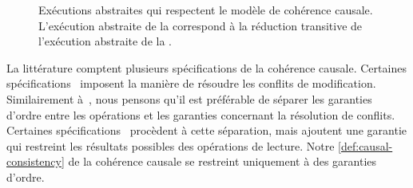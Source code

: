 \begin{figure}[tbh]
\begin{subfigure}{\linewidth}
    \caption{}\label{fig:vis-vs-pre-2}
\end{subfigure}
\caption[Exécutions abstraites qui respectent le modèle de cohérence causale]{Exécutions abstraites qui respectent le modèle de cohérence causale.
L'exécution abstraite de la  correspond à la réduction transitive de l'exécution abstraite de la .}\label{fig:vis-vs-pre}
\end{figure}

La littérature comptent plusieurs spécifications de la cohérence causale.
Certaines spécifications~\autocite{ahamad_1995_causal} imposent la manière de résoudre les conflits de modification.
Similairement à~\textcite{mahajan_2011_cac}, nous pensons qu'il est préférable de séparer les garanties d'ordre entre les opérations et les garanties concernant la résolution de conflits.
Certaines spécifications~\autocite{burckhardt_eventualconsistency_2014,viotti_consistency_2016} procèdent à cette séparation, mais ajoutent une garantie qui restreint les résultats possibles des opérations de lecture.
Notre \autoref{def:causal-consistency} de la cohérence causale se restreint uniquement à des garanties d'ordre.

